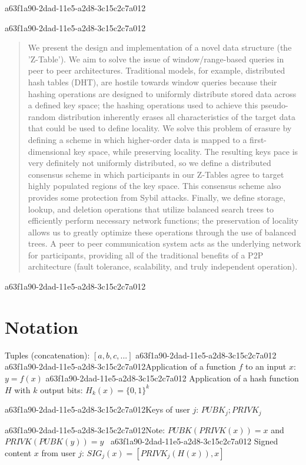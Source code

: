\documentclass[12pt]{article}
\begin{document}
a63f1a90-2dad-11e5-a2d8-3c15c2c7a012
\maketitle

a63f1a90-2dad-11e5-a2d8-3c15c2c7a012\begin{abstract}
We present the design and implementation of a novel data structure (the 'Z-Table'). We aim to solve the issue of window/range-based queries in peer to peer architectures. Traditional models, for example,  distributed hash tables (DHT), are hostile towards window queries because their hashing operations are designed to uniformly distribute stored data across a defined key space; the hashing operations used to achieve this pseudo-random distribution inherently erases all characteristics of the target data that could be used to define locality. We solve this problem of erasure by defining a scheme in which higher-order data is mapped to a first-dimensional key space, while preserving locality. The resulting keys pace is very definitely not uniformly distributed, so we define a distributed consensus scheme in which participants in our Z-Tables agree to target highly populated regions of the key space. This consensus scheme also provides some protection from Sybil attacks. Finally, we define storage, lookup, and deletion operations that utilize balanced search trees to efficiently perform necessary network functions; the preservation of locality allows us to greatly optimize these operations through the use of balanced trees. A peer to peer communication system acts as the underlying network for participants, providing all of the traditional benefits of a P2P architecture (fault tolerance, scalability, and truly independent operation).
\end{abstract}
a63f1a90-2dad-11e5-a2d8-3c15c2c7a012
\section{Notation}

Tuples (concatenation): $[a,b,c,...]$
a63f1a90-2dad-11e5-a2d8-3c15c2c7a012
a63f1a90-2dad-11e5-a2d8-3c15c2c7a012Application of a function $f$ to an input $x$: $y=f(x)$
a63f1a90-2dad-11e5-a2d8-3c15c2c7a012
Application of a hash function $H$ with $k$ output bits: $H_{k}(x) = \{0,1\}^k$

a63f1a90-2dad-11e5-a2d8-3c15c2c7a012Keys of user $j$: $ PUBK_j; PRIVK_j $

a63f1a90-2dad-11e5-a2d8-3c15c2c7a012Note: $PUBK(PRIVK(x)) = x$ and $PRIVK(PUBK(y)) = y$~
a63f1a90-2dad-11e5-a2d8-3c15c2c7a012
Signed content $x$ from user $j$: $SIG_j(x) = \left[ PRIVK_j( H(x) ), x \right]$
\end{document}
